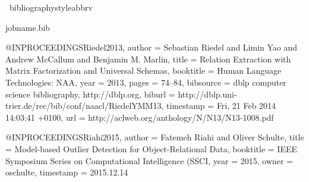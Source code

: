 {%
%	
\
bibliographystyle{abbrv}
\begin{filecontents*}{jobname.bib}
	
	@INPROCEEDINGS{Riedel2013,
		author = {Sebastian Riedel and Limin Yao and Andrew McCallum and Benjamin M.
			Marlin},
		title = {Relation Extraction with Matrix Factorization and Universal Schemas},
		booktitle = {Human Language Technologies: NAA},
		year = {2013},
		pages = {74--84},
		bibsource = {dblp computer science bibliography, http://dblp.org},
		biburl = {http://dblp.uni-trier.de/rec/bib/conf/naacl/RiedelYMM13},
		timestamp = {Fri, 21 Feb 2014 14:03:41 +0100},
		url = {http://aclweb.org/anthology/N/N13/N13-1008.pdf}
	}
	
	
	@INPROCEEDINGS{Riahi2015,
		author = {Fatemeh Riahi and Oliver Schulte},
		title = {Model-based Outlier Detection for Object-Relational Data},
		booktitle = {IEEE Symposium Series on Computational Intelligence (SSCI},
		year = {2015},
		owner = {oschulte},
		timestamp = {2015.12.14}
	}
	

\end{filecontents*}}

